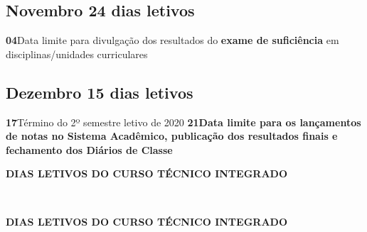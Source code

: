 \documentclass[thesis]{hmcposter}
\begin{document}
\begin{poster}
\subsection{Novembro \hfill 24 dias letivos}\textbf{04}\qquad Data limite para divulgação dos resultados do \textbf{exame de suficiência} em disciplinas/unidades curriculares \subsection{Dezembro \hfill 15 dias letivos}\textbf{17}\qquad Término do 2º semestre letivo de 2020 \newline\textbf{21}\qquad \textbf{Data limite para os lançamentos de notas no Sistema Acadêmico, publicação dos resultados finais e fechamento dos Diários de Classe} \newpage
~
\vfill
\begin{center}
\large \textbf{DIAS LETIVOS DO CURSO TÉCNICO INTEGRADO}
\newline
\null
\newline
\begin{table}
\centering
{}
\end{table}
\newline
\null
\newline
\end{center}
\vfill
\null
\columnbreak
~
\vfill
\begin{center}
\large \textbf{DIAS LETIVOS DO CURSO TÉCNICO INTEGRADO}
\newline
\null
\newline
\begin{table}
\centering
{}
\end{table}
\end{center}
\end{poster}
\end{document}
